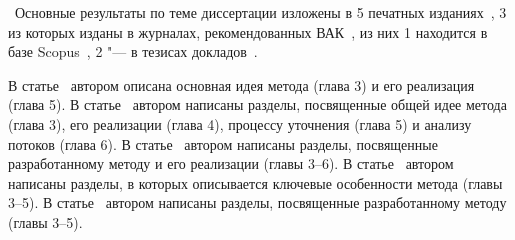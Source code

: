 
\publications\ Основные результаты по теме диссертации изложены в 5 печатных изданиях~\cite{lockatorVAK,lockatorVAK2,TMPA2017,lockatorSyrcose,lockatorTMPA}, 
    3 из которых изданы в журналах, рекомендованных ВАК~\cite{lockatorVAK,lockatorVAK2,TMPA2017}, из них 1 находится в базе Scopus~\cite{TMPA2017},
    2 "--- в тезисах докладов~\cite{lockatorSyrcose,lockatorTMPA}.

В статье~\cite{lockatorVAK} автором описана основная идея метода (глава 3) и его реализация (глава 5).
В статье~\cite{lockatorVAK2} автором написаны разделы, посвященные общей идее метода (глава 3), его реализации (глава 4), процессу уточнения (глава 5) и анализу потоков (глава 6).
В статье~\cite{TMPA2017} автором написаны разделы, посвященные разработанному методу и его реализации (главы 3--6).
В статье~\cite{lockatorSyrcose} автором написаны разделы, в которых описывается ключевые особенности метода (главы 3--5).
В статье~\cite{lockatorTMPA} автором написаны разделы, посвященные разработанному методу (главы 3--5).

